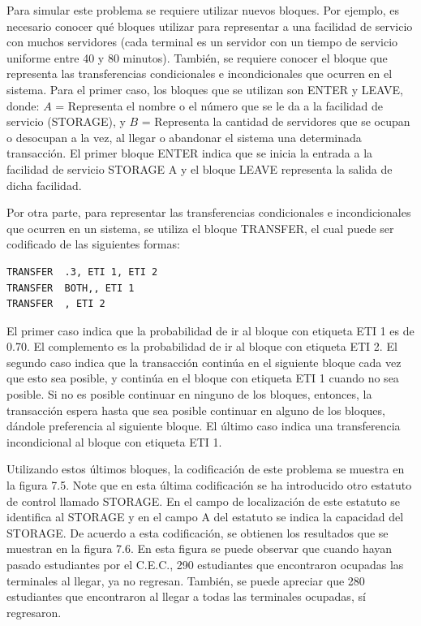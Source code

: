 \documentclass[11pt,letterpaper]{report}
\begin{document}
Para simular este problema se requiere utilizar nuevos bloques. Por
ejemplo, es necesario conocer qué bloques utilizar para representar a
una facilidad de servicio con muchos servidores (cada terminal es un
servidor con un tiempo de servicio uniforme entre 40 y 80 minutos).
También, se requiere conocer el bloque que representa las
transferencias condicionales e incondicionales que ocurren en el
sistema. Para el primer caso, los bloques que se utilizan son ENTER y
LEAVE, donde: $A$ = Representa el nombre o el número que se le da a la
facilidad de servicio (STORAGE), y $B$ = Representa la cantidad de
servidores que se ocupan o desocupan a la vez, al llegar o abandonar el
sistema una determinada transacción. El primer bloque ENTER indica que
se inicia la entrada a la facilidad de servicio STORAGE A y el bloque
LEAVE representa la salida de dicha facilidad.

Por otra parte, para representar las transferencias condicionales e
incondicionales que ocurren en un sistema, se utiliza el bloque
TRANSFER, el cual puede ser codificado de las siguientes formas:

\begin{verbatim}
TRANSFER  .3, ETI 1, ETI 2
TRANSFER  BOTH,, ETI 1
TRANSFER  , ETI 2
\end{verbatim}

El primer caso indica que la probabilidad de ir al bloque con etiqueta
ETI 1 es de 0.70. El complemento es la probabilidad de ir al bloque con
etiqueta ETI 2. El segundo caso indica que la transacción continúa en
el siguiente bloque cada vez que esto sea posible, y continúa en el
bloque con etiqueta ETI 1 cuando no sea posible. Si no es posible
continuar en ninguno de los bloques, entonces, la transacción espera
hasta que sea posible continuar en alguno de los bloques, dándole
preferencia al siguiente bloque. El último caso indica una transferencia
incondicional al bloque con etiqueta ETI 1.

Utilizando estos últimos bloques, la codificación de este problema se
muestra en la figura 7.5. Note que en esta última codificación se ha
introducido otro estatuto de control llamado STORAGE. En el campo de
localización de este estatuto se identifica al STORAGE y en el campo A
del estatuto se indica la capacidad del STORAGE. De acuerdo a esta
codificación, se obtienen los resultados que se muestran en la figura
7.6. En esta figura se puede observar que cuando hayan pasado
estudiantes por el C.E.C., 290 estudiantes que encontraron ocupadas las
terminales al llegar, ya no regresan. También, se puede apreciar que
280 estudiantes que encontraron al llegar a todas las terminales
ocupadas, sí regresaron.
\end{document}
